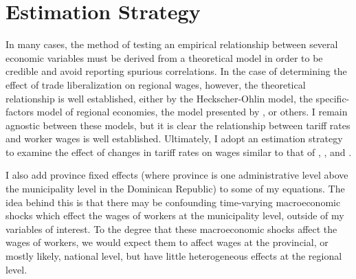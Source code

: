 \documentclass[12pt]{article}
\begin{document}
\vspace{-10pt}
\section{Estimation Strategy}
\label{sec:Model}
In many cases, the method of testing an empirical relationship between several economic variables must 
be derived from a theoretical model in order to be credible and avoid reporting spurious correlations.
In the case of determining the effect of trade liberalization on regional wages, however, the theoretical
relationship is well established, either by the Heckscher-Ohlin model,
the specific-factors model of regional economies, the model presented by \citeauthor{amiti}, or 
others. I remain agnostic between these models, but it is clear the relationship between tariff rates
and worker wages is well established. Ultimately, I adopt an estimation strategy to examine the 
effect of changes in tariff rates on wages similar to that of \citet{kovak}, \citet{amiti}, and 
\citet{amiti2012trade}.




I also add province fixed effects (where province is one administrative level
above the municipality level in the Dominican Republic) to some of my equations.
The idea behind this is that there may be confounding time-varying macroeconomic
shocks which effect the wages of workers at the municipality level, outside of
my variables of interest. To the degree that these macroeconomic shocks affect the
wages of workers, we would expect them to affect wages at the provincial,
or mostly likely, national level, but have little heterogeneous effects at the regional level.
\end{document}
